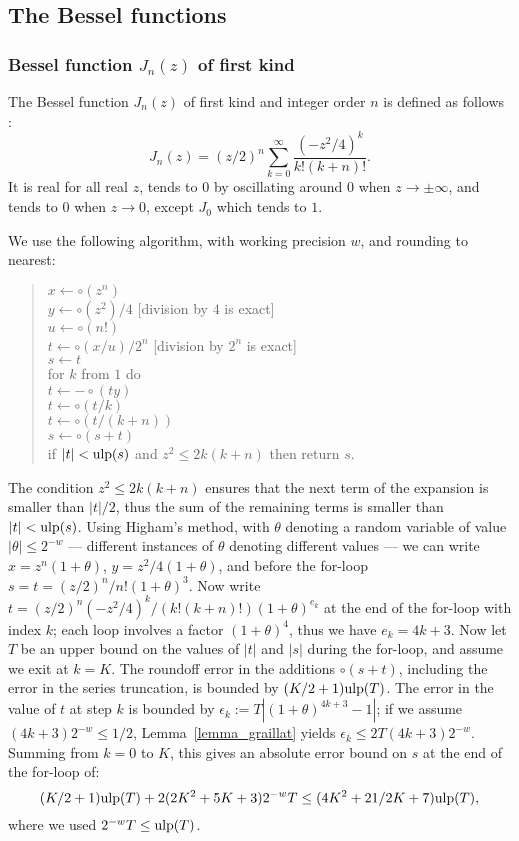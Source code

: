 \documentclass[12pt]{amsart}
\def\q{\hspace*{5mm}}
\def\ulp{{\rm ulp}}
\begin{document}
\subsection{The Bessel functions}

\subsubsection{Bessel function $J_n(z)$ of first kind}

The Bessel function $J_n(z)$ of first kind and integer order $n$
is defined as follows \cite[Eq.~(9.1.10)]{AbSt73}:
\begin{equation} \label{Jn_0}
J_n(z) = (z/2)^n \sum_{k=0}^{\infty} \frac{(-z^2/4)^k}{k! (k+n)!}.
\end{equation}
It is real for all real $z$, tends to $0$ by oscillating around $0$ when
$z \rightarrow \pm\infty$, and tends to $0$ when $z \rightarrow 0$, except
$J_0$ which tends to $1$.

We use the following algorithm, with working precision $w$, and rounding
to nearest:
\begin{quote}
$x \leftarrow \circ(z^n)$ \\
$y \leftarrow \circ(z^2)/4$ [division by $4$ is exact] \\
$u \leftarrow \circ(n!)$ \\
$t \leftarrow \circ(x/u)/2^n$ [division by $2^n$ is exact] \\
$s \leftarrow t$ \\
for $k$ from $1$ do \\
\q $t \leftarrow -\circ(ty)$ \\
\q $t \leftarrow \circ(t/k)$ \\
\q $t \leftarrow \circ(t/(k+n))$ \\
\q $s \leftarrow \circ(s+t)$ \\
\q if $|t| < \ulp(s)$ and $z^2 \leq 2k(k+n)$ then return $s$. \\
\end{quote}
The condition $z^2 \leq 2k(k+n)$ ensures that the next term of the
expansion is smaller than $|t|/2$, thus the sum of the remaining terms
is smaller than $|t| < \ulp(s)$.
Using Higham's method, with $\theta$ denoting a random variable of value
$|\theta| \leq 2^{-w}$ --- different instances of $\theta$ denoting
different values --- we can write $x = z^n (1+\theta)$,
$y = z^2/4 (1+\theta)$,
and before the for-loop $s = t = (z/2)^n/n! (1+\theta)^3$.
Now write $t = (z/2)^n (-z^2/4)^k / (k! (k+n)!) (1+\theta)^{e_k}$ at the end of
the for-loop with index $k$; each loop involves a factor $(1+\theta)^4$,
thus we have $e_k = 4k+3$.
Now let $T$ be an upper bound on the values of $|t|$ and $|s|$ during the
for-loop, and assume we exit at $k=K$.
The roundoff error in the additions
$\circ(s+t)$, including the error in the series
truncation, is bounded by $(K/2+1) \ulp(T)$.
The error in the value of $t$ at step $k$ is bounded by $\epsilon_k :=
T |(1+\theta)^{4k+3}
-1|$; if we assume $(4k+3) 2^{-w} \leq 1/2$, Lemma~\ref{lemma_graillat}
yields $\epsilon_k \leq 2 T (4k+3) 2^{-w}$. Summing from $k=0$ to $K$,
this gives an absolute error bound on $s$ at the end of the for-loop of:
\[ (K/2+1) \ulp(T) + 2 (2K^2+5K+3) 2^{-w} T \leq (4K^2+21/2K+7) \ulp(T), \]
where we used $2^{-w} T \leq \ulp(T)$.
\end{document}
